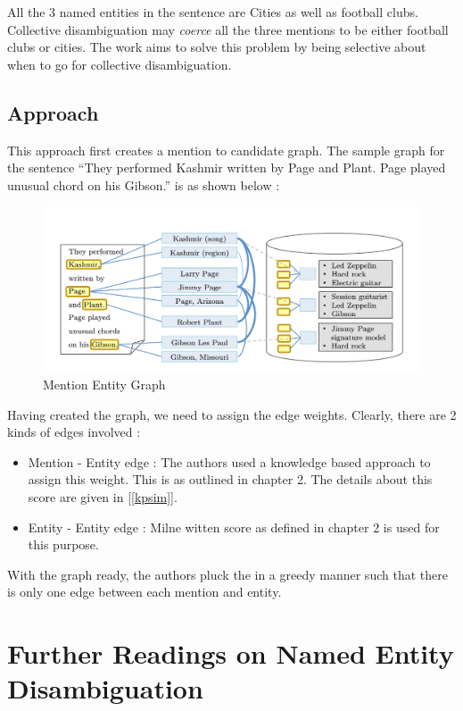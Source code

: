 All the 3 named entities in the sentence are Cities as well as football clubs.
Collective disambiguation may \emph{coerce} all the three mentions to be 
either football clubs or cities. The work aims to solve this problem by being selective about when to go for collective disambiguation.

\section{Approach}
This approach first creates a mention to candidate graph. The sample graph for the sentence ``They performed Kashmir 
written by Page and Plant. Page played unusual chord on his Gibson.'' is as shown below : 
 \begin{figure}[H]
 \centering
 \includegraphics[bb=0 0 1074 469,scale=0.3]{./megraph.png}
 \caption{Mention Entity Graph}
\end{figure}


Having created the graph, we need to assign the edge weights. Clearly, there are 2 kinds of edges involved : 
\begin{itemize}
 \item Mention - Entity edge : The authors used a knowledge based approach to assign this weight. This is as outlined in chapter 2.
 The details about this score are given in [\ref{kpsim}].
 \item Entity - Entity edge : Milne witten score as defined in chapter 2 is used for this purpose.
\end{itemize}

With the graph ready, the authors pluck the in a greedy manner such that there is only one edge between each 
mention and entity.


\chapter{Further Readings on Named Entity Disambiguation}

